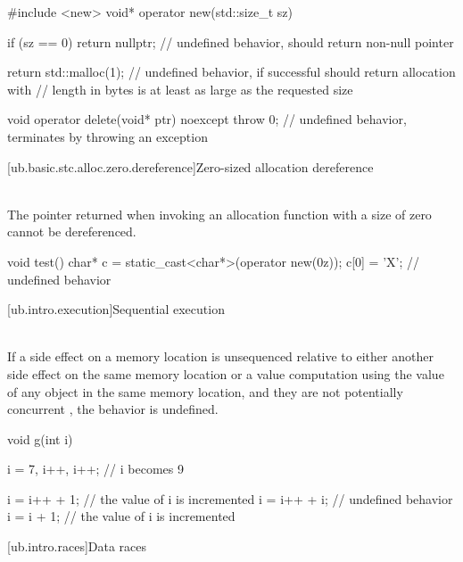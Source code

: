 \pnum
\begin{example}
\begin{codeblock}
#include <new>
void* operator new(std::size_t sz) {
  if (sz == 0)
    return nullptr;             // undefined behavior,  should return non-null pointer

  return std::malloc(1);        // undefined behavior, if successful should return allocation with
                                // length in bytes is at least as large as the requested size
}
void operator delete(void* ptr) noexcept {
  throw 0;                      // undefined behavior, terminates by throwing an exception
}
\end{codeblock}
\end{example}

[ub.basic.stc.alloc.zero.dereference]{Zero-sized allocation dereference}

\pnum
{} \\
The pointer returned when invoking an allocation function with a size of zero
cannot be dereferenced.

\pnum
\begin{example}
\begin{codeblock}
void test()
{
    char* c = static_cast<char*>(operator new(0z));
    c[0] = 'X';  // undefined behavior
}
\end{codeblock}
\end{example}


[ub.intro.execution]{Sequential execution}

\pnum
{} \\
If a side effect on a
memory location  is unsequenced relative to either another side effect on the same memory location or
a value computation using the value of any object in the same memory location, and they are not potentially
concurrent , the behavior is undefined.

\pnum
\begin{example}
\begin{codeblock}
void g(int i) {
  i = 7, i++, i++;  // i becomes 9

  i = i++ + 1;  // the value of i is incremented
  i = i++ + i;  // undefined behavior
  i = i + 1;    // the value of i is incremented
}
\end{codeblock}
\end{example}

[ub.intro.races]{Data races}

